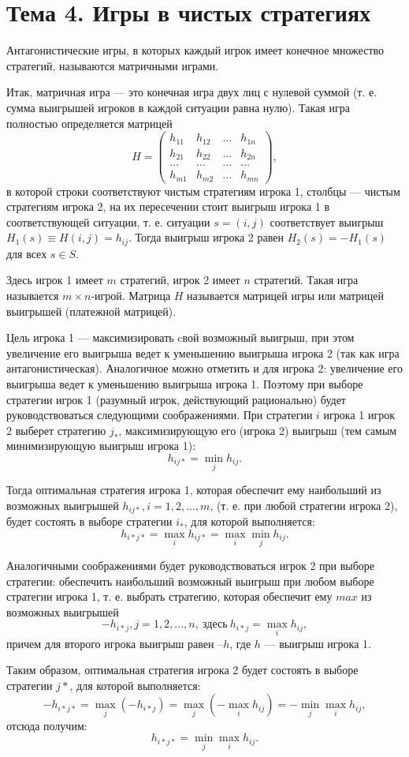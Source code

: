 \section{Тема 4. Игры в чистых стратегиях}

Антагонистические игры, в которых каждый игрок имеет конечное множество стратегий, называются матричными играми.

Итак, матричная игра --- это конечная игра двух лиц с нулевой суммой (т. е. сумма выигрышей игроков в каждой ситуации равна нулю). Такая игра полностью определяется матрицей
\[ H = \begin{pmatrix}
h_{11} & h_{12} & \dots & h_{1n} \\ 
h_{21} & h_{22} & \dots & h_{2n} \\ 
\dots & \dots & \dots & \dots \\ 
h_{m1} & h_{m2} & \dots & h_{mn}
\end{pmatrix},  \]
в которой строки соответствуют чистым стратегиям игрока 1, столбцы --- чистым стратегиям игрока 2, на их пересечении стоит выигрыш игрока 1 в соответствующей ситуации, т. е. ситуации $s = (i, j)$ соответствует выигрыш $H_1(s) \equiv H (i, j) =  h_{ij}$. Тогда выигрыш игрока 2 равен $H_2(s) = - H_1(s)$ для всех $s \in S$.

Здесь игрок 1 имеет $m$ стратегий, игрок 2 имеет $n$ стратегий. Такая игра называется $m\times n$‑игрой. Матрица $H$ называется матрицей игры или матрицей выигрышей (платежной матрицей).

Цель игрока 1 --- максимизировать cвой возможный выигрыш, при этом увеличение его выигрыша ведет к уменьшению выигрыша игрока 2 (так как игра антагонистическая). Аналогичное можно отметить и для игрока 2: увеличение его выигрыша ведет к уменьшению выигрыша игрока 1. Поэтому при выборе стратегии игрок 1 (разумный игрок, действующий рационально) будет руководствоваться следующими соображениями. При стратегии $i$ игрока 1 игрок 2 выберет стратегию $j_*$, максимизирующую его (игрока 2) выигрыш (тем самым минимизирующую выигрыш игрока 1):
\[ h_{ij*} = \min_j h_{ij}.\]

Тогда оптимальная стратегия игрока 1, которая обеспечит ему наибольший из возможных выигрышей $h_{ij*}, i = 1, 2, ..., m$, (т. е. при любой стратегии игрока 2), будет состоять в выборе стратегии $i_*$, для которой выполняется:
\[ h_{i*j*} = \max_i h_{ij*} = \max_i \min_j h_{ij}. \]

Аналогичными соображениями будет руководствоваться игрок 2 при выборе стратегии: обеспечить наибольший возможный выигрыш при любом выборе стратегии игрока 1, т. е. выбрать стратегию, которая обеспечит ему $max$ из возможных выигрышей
\[ -h_{i*j},j = 1, 2,..., n, \ \text{здесь} \ h_{i*j} = \max_i h_{ij}, \]
причем для второго игрока выигрыш равен $–h$, где $h$ --- выигрыш игрока 1.

Таким образом, оптимальная стратегия игрока 2 будет состоять в выборе стратегии $j*$, для которой выполняется:
\[ -h _{i*j*} = \max_j (-h_{i*j}) = \max_j (-\max_i h_{ij}) = - \min_j \max_i h_{ij}, \]
отсюда получим:
\[h_{i*j*} = \min_j \max_i h_{ij}.\]